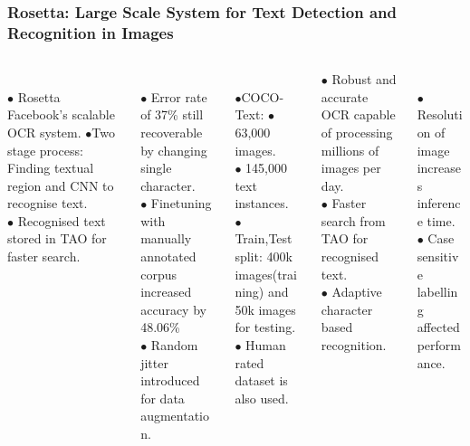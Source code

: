\documentclass[]{beamer}
\begin{document}
\begin{frame}\frametitle{Rosetta: Large Scale System for Text Detection and Recognition in Images\cite{rosettaDataset}}
\begin{columns}
	\begin{column}{0.20\textwidth}
		{}\\
		$\bullet$ Rosetta Facebook's scalable OCR system.
		$\bullet$Two stage process:
		Finding textual region and CNN to recognise text.\\
		$\bullet$ Recognised text stored in TAO for faster search. 
	\end{column}
	\begin{column}{0.23\textwidth}
		{}\\
		$\bullet$ Error rate of 37\% still recoverable by changing single character. \\
		$\bullet$ Finetuning with manually annotated corpus increased accuracy by 48.06\%\\
		$\bullet$ Random jitter introduced for data augmentation.
	\end{column}
	\begin{column}{0.20\textwidth}
		{}\\$\bullet$COCO-Text:
		$\bullet$ 63,000 images.\\
		$\bullet$ 145,000 text instances.\\
		$\bullet$ Train,Test split: 400k images(training)
		and 50k images for testing.\\
		$\bullet$ Human rated dataset is also used.
	\end{column}
	\begin{column}{0.20\textwidth}
		{}
		
			$\bullet$ Robust and accurate OCR capable of processing millions of images per day.\\
			$\bullet$ Faster search from TAO for recognised text.\\
			$\bullet$ Adaptive character based recognition.
	\end{column}
	\begin{column}{0.20\textwidth}
		{}
		\\	$\bullet$ Resolution of image increases inference time.\\
			$\bullet$ Case sensitive labelling affected performance.\\
	\end{column}	
\end{columns}
\end{frame}
\end{document}
